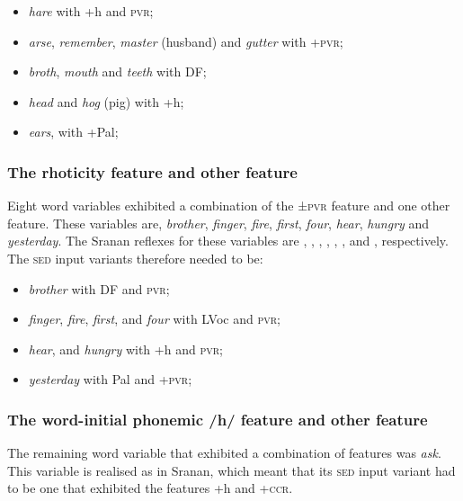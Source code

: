 {{{{{{{{{\begin{itemize}
\item {\emph{hare} with +h and \textminus\textsc{pvr};}
\item {\emph{arse}, \emph{remember}, \emph{master} (husband) and \emph{gutter} with +\textsc{pvr}; }
\item{\emph{broth}, \emph{mouth} and \emph{teeth} with \textminus{}DF; }
\item {\emph{head} and \emph{hog} (pig) with +h;}
\item{\emph{ears}, with +Pal; }
\end{itemize}

\subsubsection{The rhoticity feature and other feature} \label{3.3.2.7}
Eight word variables exhibited a combination of the ±\textsc{pvr} feature and one other feature. These variables are, \emph{brother}, \emph{finger}, \emph{fire}, \emph{first}, \emph{four}, \emph{hear}, \emph{hungry} and \emph{yesterday}. The Sranan reflexes for these variables are \textipa{[brada]}, \textipa{[faija]}, \textipa{[fiNga]}, \textipa{[fosi]}, \textipa{[fO]}, \textipa{[jeri]}, \textipa{[haNgri]} and \textipa{[esrede]}, respectively. The \textsc{sed} input variants therefore needed to be:

\begin{itemize}
\item {\emph{brother} with \textminus{}DF and \textminus\textsc{pvr};}
\item {\emph{finger}, \emph{fire}, \emph{first}, and \emph{four} with \textminus{}LVoc and \textminus\textsc{pvr}; }
\item{\emph{hear}, and \emph{hungry} with +h and \textminus\textsc{pvr}; }
\item {\emph{yesterday} with \textminus Pal and +\textsc{pvr};}
\end{itemize}

\subsubsection{The word-initial phonemic /h/ feature and other feature} \label{3.3.2.8}
The remaining word variable that exhibited a combination of features was \emph{ask}. This variable is realised as \textipa{[hakisi]} in Sranan, which meant that its \textsc{sed} input variant had to be one that exhibited the features +h and +\textsc{ccr}.

}}}}}}}}}
